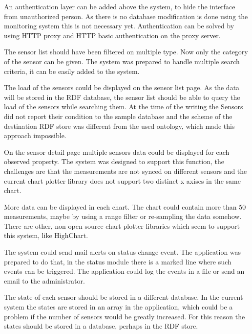 An authentication layer can be added above the system, to hide the interface from unauthorized person. As there is no database modification is done using the monitoring system this is not necessary yet. Authentication can be solved by using HTTP proxy and HTTP basic authentication on the proxy server.

The sensor list should have been filtered on multiple type. Now only the category of the sensor can be given. The system was prepared to handle multiple search criteria, it can be easily added to the system.

The load of the sensors could be displayed on the sensor list page. As the data will be stored in the RDF database, the sensor list should be able to query the load of the sensors while searching them. At the time of the writing the Sensors did not report their condition to the sample database and the scheme of the destination RDF store was different from the used ontology, which made this approach impossible.

On the sensor detail page multiple sensors data could be displayed for each observed property. The system was designed to support this function, the challenges are that the measurements are not synced on different sensors and the current chart plotter library does not support two distinct x axises in the same chart. 

More data can be displayed in each chart. The chart could contain more than 50 measurements, maybe by using a range filter or re-sampling the data somehow. There are other, non open source chart plotter libraries which seem to support this system, like HighChart.

The system could send mail alerts on status change event. The application was prepared to do that, in the status module there is a marked line where such events can be triggered. The application could log the events in a file or send an email to the administrator.

The state of each sensor should be stored in a different database. In the current system the states are stored in an array in the application, which could be a problem if the number of sensors would be greatly increased. For this reason the states should be stored in a database, perhaps in the RDF store.

